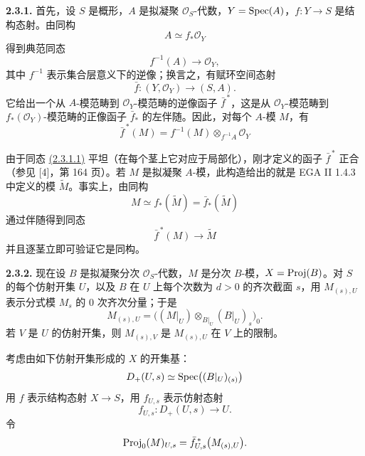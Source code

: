 \textbf{2.3.1.} 首先，设 \(S\) 是概形，\(A\) 是拟凝聚 \(\mathcal O_S\)-代数，\(Y=\operatorname{Spec}(A)\)，\(f:Y\to S\) 是结构态射。由同构
\[
  A\simeq f_*\mathcal O_Y
\]
得到典范同态
\begin{equation}\tag{2.3.1.1}
  f^{-1}(A)\longrightarrow \mathcal O_Y,
\end{equation}
其中 \(f^{-1}\) 表示集合层意义下的逆像；换言之，有赋环空间态射
\begin{equation}\tag{2.3.1.2}
  \bar f:(Y,\mathcal O_Y)\longrightarrow (S,A).
\end{equation}
它给出一个从 \(A\)-模范畴到 \(\mathcal O_Y\)-模范畴的逆像函子 \(\bar f^{\,*}\)，这是从 \(\mathcal O_Y\)-模范畴到 \(f_*(\mathcal O_Y)\)-模范畴的正像函子 \(\bar f_*\) 的左伴随。因此，对每个 \(A\)-模 \(M\)，有
\begin{equation}\tag{2.3.1.3}
  \bar f^{\,*}(M)=f^{-1}(M)\otimes_{f^{-1}A}\mathcal O_Y
\end{equation}


由于同态 \hyperlink{sga6.e06.eq.2-3-1-1}{(2.3.1.1)} 平坦（在每个茎上它对应于局部化），刚才定义的函子 \(\bar f^{\,*}\) 正合（参见 [4]，第 164 页）。若 \(M\) 是拟凝聚 \(A\)-模，此构造给出的就是 EGA II 1.4.3 中定义的模 \(\widetilde M\)。事实上，由同构
\[
  M\simeq f_*(\widetilde M)=\bar f_*(\widetilde M)
\]
通过伴随得到同态
\[
  \bar f^{\,*}(M)\longrightarrow \widetilde M
\]
并且逐茎立即可验证它是同构。

\textbf{2.3.2.} 现在设 \(B\) 是拟凝聚分次 \(\mathcal O_S\)-代数，\(M\) 是分次 \(B\)-模，\(X=\operatorname{Proj}(B)\)。对 \(S\) 的每个仿射开集 \(U\)，以及 \(B\) 在 \(U\) 上每个次数为 \(d>0\) 的齐次截面 \(s\)，用 \(M_{(s),U}\) 表示分式模 \(M_s\) 的 \(0\) 次齐次分量；于是
\[
  M_{(s),U}=
  \bigl((M|_U)\otimes_{B|_U}(B|_U)_s\bigr)_0 .
\]
若 \(V\) 是 \(U\) 的仿射开集，则 \(M_{(s),V}\) 是 \(M_{(s),U}\) 在 \(V\) 上的限制。

考虑由如下仿射开集形成的 \(X\) 的开集基：
\[
  D_+(U,s)\simeq \operatorname{Spec}\bigl((B|_U)_{(s)}\bigr)
\]
用 \(f\) 表示结构态射 \(X\to S\)，用 \(f_{U,s}\) 表示仿射态射
\[
  f_{U,s}:D_+(U,s)\longrightarrow U .
\]
令
\[
  \operatorname{Proj}_0(M)_{U,s}
  =
  \bar f_{U,s}^{\,*}\bigl(M_{(s),U}\bigr).
\]

